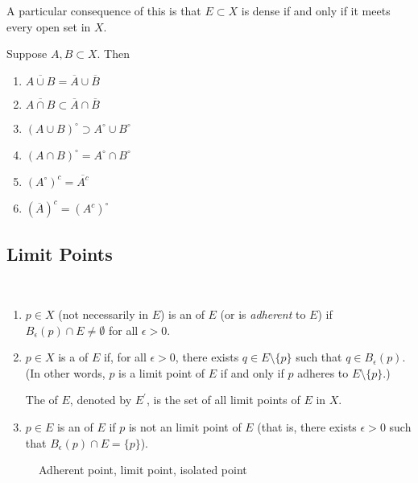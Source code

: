 \begin{remark}
A particular consequence of this is that $E\subset X$ is dense if and only if it meets every open set in $X$.
\end{remark}

\begin{lemma}
Suppose $A,B\subset X$. Then
\begin{enumerate}[label=(\roman*)]
\item $\overline{A\cup B}=\overline{A}\cup\overline{B}$
\item $\overline{A\cap B}\subset\overline{A}\cap\overline{B}$
\item $(A\cup B)^\circ\supset A^\circ\cup B^\circ$
\item $(A\cap B)^\circ=A^\circ\cap B^\circ$
\item $(A^\circ)^c=\overline{A^c}$
\item $(\overline{A})^c=(A^c)^\circ$
\end{enumerate}
\end{lemma}
\pagebreak

\subsection{Limit Points}
\begin{definition} \
\begin{enumerate}[label=(\roman*)]
\item $p\in X$ (not necessarily in $E$) is an  of $E$ (or is \emph{adherent} to $E$) if $B_\epsilon(p)\cap E\neq\emptyset$ for all $\epsilon>0$.
\item $p\in X$ is a \vocab{limit point}\index{limit point} of $E$ if, for all $\epsilon>0$, there exists $q\in E\setminus\{p\}$ such that $q\in B_\epsilon(p)$. (In other words, $p$ is a limit point of $E$ if and only if $p$ adheres to $E\setminus\{p\}$.)

The  of $E$, denoted by $E^\prime$, is the set of all limit points of $E$ in $X$.

\item $p\in E$ is an  of $E$ if $p$ is not an limit point of $E$ (that is, there exists $\epsilon>0$ such that $B_\epsilon(p)\cap E=\{p\}$).
\end{enumerate}
\end{definition}

\begin{figure}[H]
\centering
{}
\caption{Adherent point, limit point, isolated point}
\end{figure}

